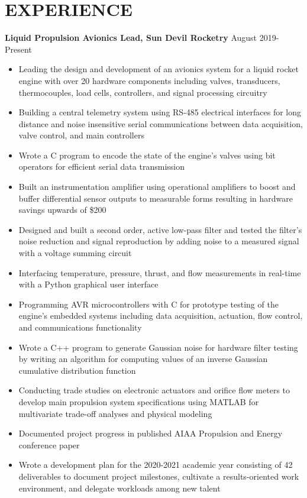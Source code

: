 \documentclass{article}
\begin{document}
\section{EXPERIENCE}
\textbf{Liquid Propulsion Avionics Lead, Sun Devil Rocketry}
\hfill
\vspace{0.5em}
August 2019-Present
\begin{itemize}
	\item{Leading the design and development of an avionics system for a liquid rocket engine with over 20 hardware components including valves, transducers, thermocouples, load cells, controllers, and signal processing circuitry}
	\item{Building a central telemetry system using RS-485 electrical interfaces for long distance and noise insensitive serial communications between data acquisition, valve control, and main controllers}
	\item{Wrote a C program to encode the state of the engine's valves using bit operators for efficient serial data transmission}
	\item{Built an instrumentation amplifier using operational amplifiers to boost and buffer differential sensor outputs to measurable forms resulting in hardware savings upwards of \$200}
	\item{Designed and built a second order, active low-pass filter and tested the filter's noise reduction and signal reproduction by adding noise to a measured signal with a voltage summing circuit}
	\item{Interfacing temperature, pressure, thrust, and flow measurements in real-time with a Python graphical user interface}
	\item{Programming AVR microcontrollers with C for prototype testing of the engine's embedded systems including data acquisition, actuation, flow control, and communications functionality}
	\item{Wrote a C++ program to generate Gaussian noise for hardware filter testing by writing an algorithm for computing values of an inverse Gaussian cumulative distribution function}
	\item{Conducting trade studies on electronic actuators and orifice flow meters to develop main propulsion system specifications using MATLAB for multivariate trade-off analyses and physical modeling}
	\item{Documented project progress in published AIAA Propulsion and Energy conference paper}
	\item{Wrote a development plan for the 2020-2021 academic year consisting of 42 deliverables to document project milestones, cultivate a results-oriented work environment, and delegate workloads among new talent}
\end{itemize}
\end{document}
